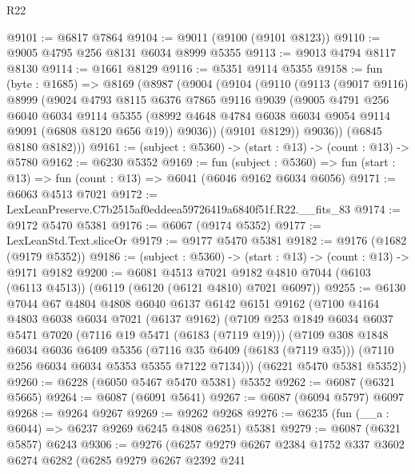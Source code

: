 \begin{lexlean}{R22}
\begin{coremodule}
@9101 := @6817 @7864
@9104 := @9011 (@9100 (@9101 @8123))
@9110 := @9005 @4795 @256 @8131 @6034 @8999 @5355
@9113 := @9013 @4794 @8117 @8130
@9114 := @1661 @8129
@9116 := @5351 @9114 @5355
@9158 := fun (byte : @1685) =>
  @8169
    (@8987
      (@9004
        (@9104
          (@9110
            (@9113
              (@9017 @9116)
              @8999
              (@9024
                @4793
                @8115
                @6376
                @7865
                @9116
                @9039
                (@9005
                  @4791
                  @256
                  @6040
                  @6034
                  @9114
                  @5355
                  (@8992 @4648 @4784 @6038 @6034 @9054 @9114 @9091 (@6808 @8120 @656 @19))
                  @9036))
              (@9101 @8129))
            @9036))
        (@6845 @8180 @8182)))
@9161 := (subject : @5360) -> (start : @13) -> (count : @13) -> @5780
@9162 := @6230 @5352
@9169 := fun (subject : @5360) =>
  fun (start : @13) => fun (count : @13) => @6041 (@6046 @9162 @6034 @6056)
@9171 := @6063 @4513 @7021
@9172 := LexLeanPreserve.C7b2515af0eddeea59726419a6840f51f.R22.__fits_83
@9174 := @9172 @5470 @5381
@9176 := @6067 (@9174 @5352)
@9177 := LexLeanStd.Text.sliceOr
@9179 := @9177 @5470 @5381
@9182 := @9176 (@1682 (@9179 @5352))
@9186 := (subject : @5360) -> (start : @13) -> (count : @13) -> @9171 @9182
@9200 := @6081
    @4513
    @7021
    @9182
    @4810
    @7044
    (@6103 (@6113 @4513))
    (@6119 (@6120 (@6121 @4810) @7021 @6097))
@9255 := @6130
    @7044
    @67
    @4804
    @4808
    @6040
    @6137
    @6142
    @6151
    @9162
    (@7100
      @4164
      @4803
      @6038
      @6034
      @7021
      (@6137 @9162)
      (@7109
        @253
        @1849
        @6034
        @6037
        @5471
        @7020
        (@7116 @19 @5471 (@6183 (@7119 @19)))
        (@7109
          @308
          @1848
          @6034
          @6036
          @6409
          @5356
          (@7116 @35 @6409 (@6183 (@7119 @35)))
          (@7110 @256 @6034 @6034 @5353 @5355 @7122 @7134)))
      (@6221 @5470 @5381 @5352))
@9260 := @6228 (@6050 @5467 @5470 @5381) @5352
@9262 := @6087 (@6321 @5665)
@9264 := @6087 (@6091 @5641)
@9267 := @6087 (@6094 @5797) @6097
@9268 := @9264 @9267
@9269 := @9262 @9268
@9276 := @6235 (fun (__a : @6044) => @6237 @9269 @6245 @4808 @6251) @5381
@9279 := @6087 (@6321 @5857) @6243
@9306 := @9276
    (@6257
      @9279
      @6267
      @2384
      @1752
      @337
      @3602
      @6274
      @6282
      (@6285
        @9279
        @6267
        @2392
        @241

\end{coremodule}
\end{lexlean}
